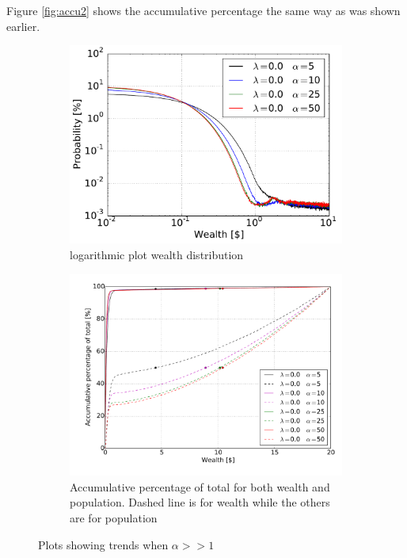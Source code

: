 Figure \ref{fig:accu2} shows the accumulative percentage the same way as was shown earlier. 
\begin{figure}[H]
    \begin{subfigure}{0.5\textwidth}
        \centering
        \includegraphics[width=\linewidth]{result/new_5d/5d-00-log}
        \caption{logarithmic plot wealth distribution }
        \label{fig:hugeAlpha}
    \end{subfigure}
    \begin{subfigure}{0.5\textwidth}
        \centering
        \includegraphics[width=\linewidth]{result/5d-accu-persons-accu-money-extra}
        \caption{Accumulative percentage of total for both wealth and population. Dashed line is for wealth while the others are for population}
        \label{fig:accuHugeAlpha}
    \end{subfigure}
    \caption{Plots showing trends when $\alpha >> 1$}
\end{figure}

